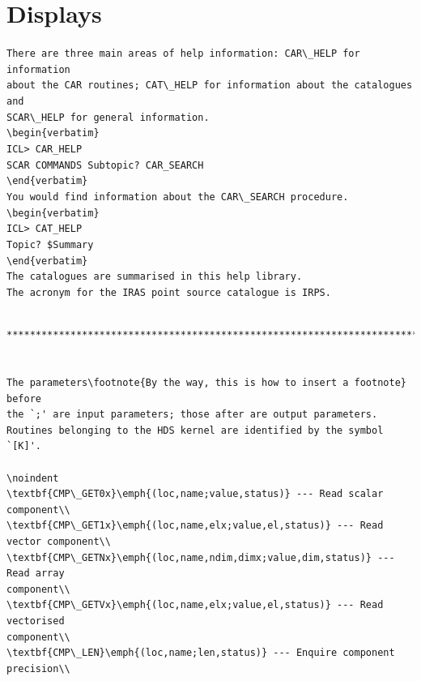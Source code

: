 \documentclass[11pt,twoside]{article}
\newcommand{\xlabel}[1]{}
\begin{document}
\newpage

\section{Displays\xlabel{displays}}

{\small
\verb+There are three main areas of help information: CAR\_HELP for information+\\
\verb+about the CAR routines; CAT\_HELP for information about the catalogues and +\\
\verb+SCAR\_HELP for general information.+\\
\verb+\begin{verbatim}+\\
\hspace*{10mm}\verb+ICL> CAR_HELP+\\
\hspace*{10mm}\verb+SCAR COMMANDS Subtopic? CAR_SEARCH+\\
\verb+\end{verbatim}+\\
\verb+You would find information about the CAR\_SEARCH procedure.+\\
\verb+\begin{verbatim}+\\
\hspace*{10mm}\verb+ICL> CAT_HELP+\\
\hspace*{10mm}\verb+Topic? $Summary+\\
\verb+\end{verbatim}+\\
\verb+The catalogues are summarised in this help library.+\\
\verb+The acronym for the IRAS point source catalogue is IRPS.+\\
\begin{verbatim}

******************************************************************************


The parameters\footnote{By the way, this is how to insert a footnote} before
the `;' are input parameters; those after are output parameters.
Routines belonging to the HDS kernel are identified by the symbol `[K]'.

\noindent
\textbf{CMP\_GET0x}\emph{(loc,name;value,status)} --- Read scalar component\\
\textbf{CMP\_GET1x}\emph{(loc,name,elx;value,el,status)} --- Read vector component\\
\textbf{CMP\_GETNx}\emph{(loc,name,ndim,dimx;value,dim,status)} --- Read array 
component\\
\textbf{CMP\_GETVx}\emph{(loc,name,elx;value,el,status)} --- Read vectorised 
component\\
\textbf{CMP\_LEN}\emph{(loc,name;len,status)} --- Enquire component precision\\



\end{verbatim}}
\end{document}
